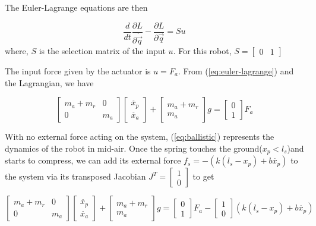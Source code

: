 \documentclass[12pt, a4paper]{report}
\begin{document}
The Euler-Lagrange equations are then

\begin{equation}
	\frac{d}{dt}\frac{\partial L}{\partial \dot{\vec{q}}} - \frac{\partial L}{\partial \vec{q}} = Su
	\label{eq:euler-lagrange}
\end{equation}
where,
$S$ is the selection matrix of the input $u$. For this robot, $S = \begin{bmatrix}
0&1
\end{bmatrix}$\par 
The input force given by the actuator is $u = F_{a}$. From (\ref{eq:euler-lagrange}) and the Lagrangian, we have

\begin{equation}
\begin{bmatrix}
m_{a} + m_{r}&0\\
0 & m_{a}
\end{bmatrix}
\begin{bmatrix}
\ddot{x_{p}}\\
\ddot{x_{a}}
\end{bmatrix}
+\begin{bmatrix}
m_{a}+m_{r}\\m_{a}
\end{bmatrix}g =
\begin{bmatrix}
0\\1
\end{bmatrix}
F_{a}
\label{eq:ballistic}
\end{equation}

With no external force acting on the system, (\ref{eq:ballistic}) represents the dynamics of the robot in mid-air. Once the spring touches the ground($x_{p}<l_{s}$)and starts to compress, we can add its external force $f_{s} = -(k(l_{s}-x_{p})+b\dot{x_{p}})$ to the system via its transposed Jacobian $J^{T} = \begin{bmatrix}
1\\0
\end{bmatrix}$ to get

\begin{equation}
\begin{bmatrix}
m_{a} + m_{r}&0\\
0 & m_{a}
\end{bmatrix}
\begin{bmatrix}
\ddot{x_{p}}\\
\ddot{x_{a}}
\end{bmatrix}
+\begin{bmatrix}
m_{a}+m_{r}\\m_{a}
\end{bmatrix}g =
\begin{bmatrix}
0\\1
\end{bmatrix}
F_{a} - 
\begin{bmatrix}
1\\0
\end{bmatrix}
(k(l_{s}-x_{p})+b\dot{x_{p}})
\label{eq:ground}
\end{equation}
\end{document}
